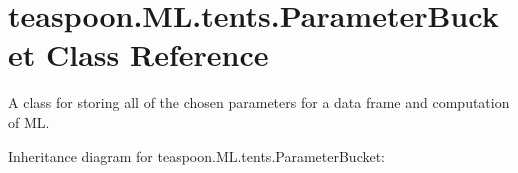 \hypertarget{classteaspoon_1_1_m_l_1_1tents_1_1_parameter_bucket}{}\section{teaspoon.\+M\+L.\+tents.\+Parameter\+Bucket Class Reference}
\label{classteaspoon_1_1_m_l_1_1tents_1_1_parameter_bucket}


A class for storing all of the chosen parameters for a data frame and computation of ML.  




Inheritance diagram for teaspoon.\+M\+L.\+tents.\+Parameter\+Bucket\+:
